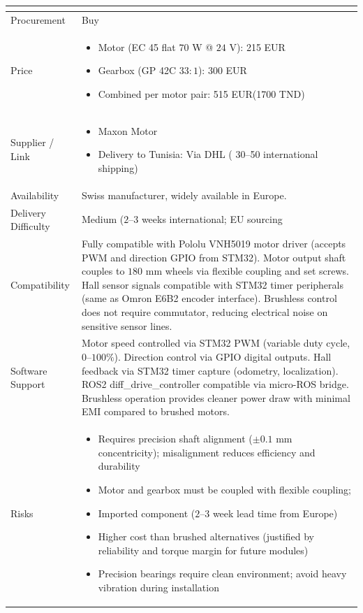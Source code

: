 \documentclass[12pt,a4paper]{article}
\begin{document}
\begin{longtable}{|p{4cm}|p{10cm}|}
\begin{itemize}
\end{itemize}
\\
\hline

Procurement &
Buy \\
\hline

Price &
\begin{itemize}
\item Motor (EC 45 flat $70$ W @ $24$ V): 215 EUR 
\item Gearbox (GP 42C $33:1$): 300 EUR
\item Combined per motor pair:  515 EUR(1700 TND)
\end{itemize}
\\
\hline

Supplier / Link &
\begin{itemize}
\item Maxon Motor
\item Delivery to Tunisia: Via DHL ( 30--50 international shipping)
\end{itemize}
\\
\hline

Availability &
Swiss manufacturer, widely available in Europe. \\
\hline

Delivery Difficulty &
Medium ($2$--$3$ weeks international; EU sourcing  \\
\hline

Compatibility &
Fully compatible with Pololu VNH5019 motor driver (accepts PWM and direction GPIO from STM32). Motor output shaft couples to $180$ mm wheels via flexible coupling and set screws. Hall sensor signals compatible with STM32 timer peripherals (same as Omron E6B2 encoder interface). Brushless control does not require commutator, reducing electrical noise on sensitive sensor lines. \\
\hline

Software Support &
Motor speed controlled via STM32 PWM (variable duty cycle, $0$--$100\%$). Direction control via GPIO digital outputs. Hall feedback via STM32 timer capture (odometry, localization). ROS2 diff\_drive\_controller compatible via micro-ROS bridge. Brushless operation provides cleaner power draw with minimal EMI compared to brushed motors. \\
\hline

Risks &
\begin{itemize}
\item Requires precision shaft alignment ($\pm 0.1$ mm concentricity); misalignment reduces efficiency and durability
\item Motor and gearbox must be coupled with flexible coupling; 
\item Imported component ($2$--$3$ week lead time from Europe)
\item Higher cost than brushed alternatives (justified by reliability and torque margin for future modules)
\item Precision bearings require clean environment; avoid heavy vibration during installation
\end{itemize}
\\
\hline


\end{longtable}
\end{document}
